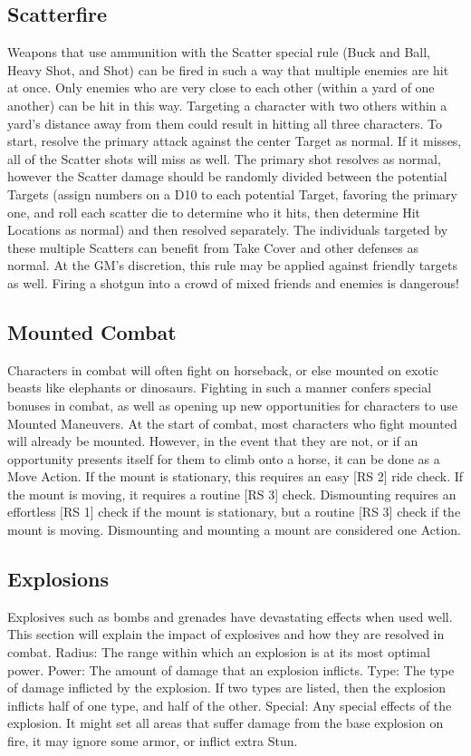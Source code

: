 \documentclass[oneside,11pt,english]{book}
\begin{document}
\subsection{Scatterfire} %
Weapons that use ammunition with the Scatter special rule (Buck and Ball, Heavy Shot, and Shot) can be
fired in such a way that multiple enemies are hit at once. Only enemies who are very close to each other
(within a yard of one another) can be hit in this way. Targeting a character with two others within a yard’s
distance away from them could result in hitting all three characters.
To start, resolve the primary attack against the center Target as normal. If it misses, all of the Scatter shots
will miss as well. The primary shot resolves as normal, however the Scatter damage should be randomly
divided between the potential Targets (assign numbers on a D10 to each potential Target, favoring the
primary one, and roll each scatter die to determine who it hits, then determine Hit Locations as normal)
and then resolved separately.
The individuals targeted by these multiple Scatters can benefit from Take Cover and other defenses as
normal.
At the GM’s discretion, this rule may be applied against friendly targets as well. Firing a shotgun into a
crowd of mixed friends and enemies is dangerous!

\subsection{Mounted Combat} %
Characters in combat will often fight on horseback, or else mounted on exotic beasts like elephants or
dinosaurs. Fighting in such a manner confers special bonuses in combat, as well as opening up new
opportunities for characters to use Mounted Maneuvers.
At the start of combat, most characters who fight mounted will already be mounted. However, in the
event that they are not, or if an opportunity presents itself for them to climb onto a horse, it can be done as
a Move Action. If the mount is stationary, this requires an easy [RS 2] ride check. If the mount is moving,
it requires a routine [RS 3] check.
Dismounting requires an effortless [RS 1] check if the mount is stationary, but a routine [RS 3] check if
the mount is moving. Dismounting and mounting a mount are considered one Action.

\subsection{Explosions}\label{sec:Explosions} %
Explosives such as bombs and grenades have devastating effects when used well. This section will
explain the impact of explosives and how they are resolved in combat.
Radius: The range within which an explosion is at its most optimal power.
Power: The amount of damage that an explosion inflicts.
Type: The type of damage inflicted by the explosion. If two types are listed, then the explosion inflicts
half of one type, and half of the other.
Special: Any special effects of the explosion. It might set all areas that suffer damage from the base
explosion on fire, it may ignore some armor, or inflict extra Stun.
\end{document}
